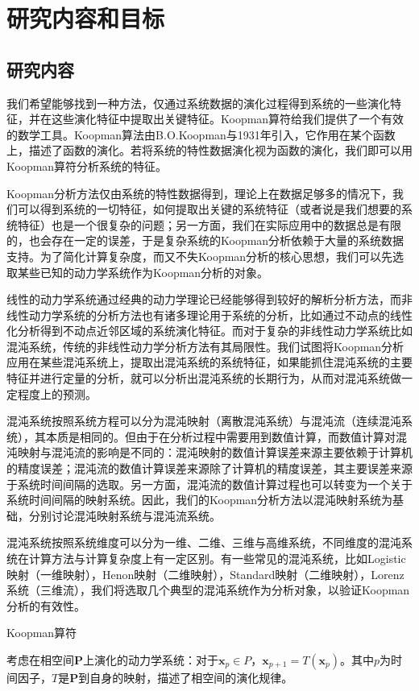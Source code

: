 \section{研究内容和目标}
\subsection{研究内容}
我们希望能够找到一种方法，仅通过系统数据的演化过程得到系统的一些演化特征，并在这些演化特征中提取出关键特征。Koopman算符给我们提供了一个有效的数学工具。Koopman算法由B.O.Koopman与1931年引入，它作用在某个函数上，描述了函数的演化。若将系统的特性数据演化视为函数的演化，我们即可以用Koopman算符分析系统的特征。

Koopman分析方法仅由系统的特性数据得到，理论上在数据足够多的情况下，我们可以得到系统的一切特征，如何提取出关键的系统特征（或者说是我们想要的系统特征）也是一个很复杂的问题；另一方面，我们在实际应用中的数据总是有限的，也会存在一定的误差，于是复杂系统的Koopman分析依赖于大量的系统数据支持。为了简化计算复杂度，而又不失Koopman分析的核心思想，我们可以先选取某些已知的动力学系统作为Koopman分析的对象。

线性的动力学系统通过经典的动力学理论已经能够得到较好的解析分析方法，而非线性动力学系统的分析方法也有诸多理论用于系统的分析，比如通过不动点的线性化分析得到不动点近邻区域的系统演化特征。而对于复杂的非线性动力学系统比如混沌系统，传统的非线性动力学分析方法有其局限性。我们试图将Koopman分析应用在某些混沌系统上，提取出混沌系统的系统特征，如果能抓住混沌系统的主要特征并进行定量的分析，就可以分析出混沌系统的长期行为，从而对混沌系统做一定程度上的预测。

混沌系统按照系统方程可以分为混沌映射（离散混沌系统）与混沌流（连续混沌系统），其本质是相同的。但由于在分析过程中需要用到数值计算，而数值计算对混沌映射与混沌流的影响是不同的：混沌映射的数值计算误差来源主要依赖于计算机的精度误差；混沌流的数值计算误差来源除了计算机的精度误差，其主要误差来源于系统时间间隔的选取。另一方面，混沌流的数值计算过程也可以转变为一个关于系统时间间隔的映射系统。因此，我们的Koopman分析方法以混沌映射系统为基础，分别讨论混沌映射系统与混沌流系统。

混沌系统按照系统维度可以分为一维、二维、三维与高维系统，不同维度的混沌系统在计算方法与计算复杂度上有一定区别。有一些常见的混沌系统，比如Logistic映射（一维映射），Henon映射（二维映射），Standard映射（二维映射），Lorenz系统（三维流），我们将选取几个典型的混沌系统作为分析对象，以验证Koopman分析的有效性。

Koopman算符

考虑在相空间$\mathbf{P}$上演化的动力学系统：对于$\mathbf{x}_p\in P$，$\mathbf{x}_{p+1}=T(\mathbf{x}_p)$。其中$p$为时间因子，$T$是$\mathbf{P}$到自身的映射，描述了相空间的演化规律。

